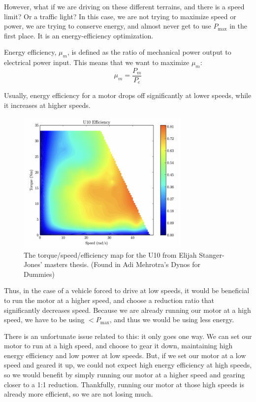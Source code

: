 \documentclass[12pt]{article}
\begin{document}
However, what if we are driving on these different terrains, and there is a speed limit? Or a traffic light? In this case, we are not trying to maximize speed or power, we are trying to conserve energy, and almost never get to use $P_{\max}$ in the first place. It is an energy-efficiency optimization.

Energy efficiency, $\mu_{m}$, is defined as the ratio of mechanical power output to electrical power input. This means that we want to maximize $\mu_{m}$:
\begin{equation}
  \mu_{m} = \frac{P_{m}}{P_{e}}
\end{equation}

Usually, energy efficiency for a motor drops off significantly at lower speeds, while it increases at higher speeds. 

\begin{figure}[H]
  \centering
  \includegraphics[width=0.75\textwidth]{motor-efficiency.png}
  \caption{The torque/speed/efficiency map for the U10 from Elijah Stanger-Jones’ masters thesis. (Found in Adi Mehrotra's Dynos for Dummies)}\label{fig:motor_efficiency}
\end{figure}

Thus, in the case of a vehicle forced to drive at low speeds, it would be beneficial to run the motor at a higher speed, and choose a reduction ratio that significantly decreases speed. Because we are already running our motor at a high speed, we have to be using $< P_{\max}$, and thus we would be using less energy.

There is an unfortunate issue related to this: it only goes one way. We can set our motor to run at a high speed, and choose to gear it down, maintaining high energy efficiency and low power at low speeds. But, if we set our motor at a low speed and geared it up, we could not expect high energy efficiency at high speeds, so we would benefit by simply running our motor at a higher speed and gearing closer to a 1:1 reduction. Thankfully, running our motor at those high speeds is already more efficient, so we are not losing much.
\end{document}
